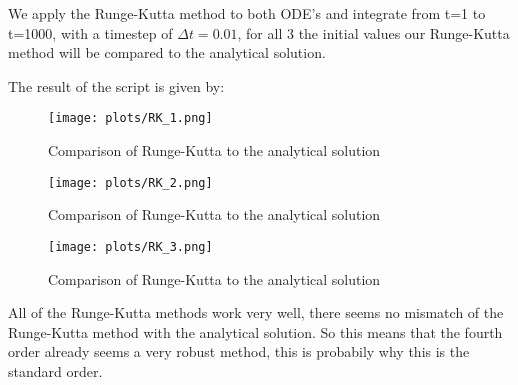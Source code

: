 We apply the Runge-Kutta method to both ODE's and integrate from t=1 to t=1000, with a timestep of $\Delta t=0.01$, for all 3 the initial values our Runge-Kutta method will be compared to the analytical solution.



The result of the script is given by:


\begin{figure}[h]
   \centering
   \texttt{[image: plots/RK\_1.png]}
      \caption{Comparison of Runge-Kutta to the analytical solution}
\end{figure}
\begin{figure}[h]
   \centering
   \texttt{[image: plots/RK\_2.png]}
      \caption{Comparison of Runge-Kutta to the analytical solution}
\end{figure}
\begin{figure}[h]
   \centering
   \texttt{[image: plots/RK\_3.png]}
      \caption{Comparison of Runge-Kutta to the analytical solution}
\end{figure}


All of the Runge-Kutta methods work very well, there seems no mismatch of the Runge-Kutta method with the analytical solution. So this means that the fourth order already seems a very robust method, this is probabily why this is the standard order.
